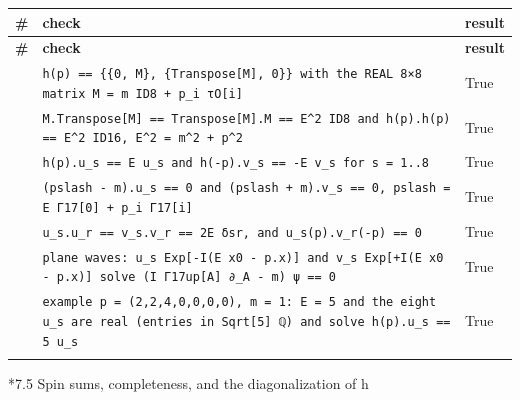 \documentclass[10pt,a4paper]{article}
\makeatletter
\renewcommand\subsubsection{\@startsection{subsubsection}{3}{\z@}{-3.25ex\@plus -1ex \@minus -.2ex}{1.5ex \@plus .2ex}{\normalfont\normalsize\bfseries\raggedright}}
\makeatother
\begin{document}
{\footnotesize
\begin{longtable}{>{\raggedright\arraybackslash}p{}>{\raggedright\arraybackslash}p{}>{\raggedright\arraybackslash}p{}}
\toprule
\textbf{\#} & \textbf{check} & \textbf{result} \\
\midrule\endfirsthead
\toprule
\textbf{\#} & \textbf{check} & \textbf{result} \\
\midrule\endhead
\endfoot
\bottomrule\endlastfoot
137 & \texttt{h(p) == \{\{0, M\}, \{Transpose[M], 0\}\} with the REAL 8×8 matrix M = m ID8 + p\_\allowbreak{}i τO[i]} & True \\
138 & \texttt{M.Transpose[M] == Transpose[M].M == E\textasciicircum{}2 ID8 and h(p).h(p) == E\textasciicircum{}2 ID16, E\textasciicircum{}2 = m\textasciicircum{}2 + p\textasciicircum{}2} & True \\
139 & \texttt{h(p).u\_\allowbreak{}s == E u\_\allowbreak{}s and h(-p).v\_\allowbreak{}s == -E v\_\allowbreak{}s for s = 1..8} & True \\
140 & \texttt{(pslash - m).u\_\allowbreak{}s == 0 and (pslash + m).v\_\allowbreak{}s == 0, pslash = E Γ17[0] + p\_\allowbreak{}i Γ17[i]} & True \\
141 & \texttt{u\_\allowbreak{}s.u\_\allowbreak{}r == v\_\allowbreak{}s.v\_\allowbreak{}r == 2E δsr, and u\_\allowbreak{}s(p).v\_\allowbreak{}r(-p) == 0} & True \\
142 & \texttt{plane waves: u\_\allowbreak{}s Exp[-I(E x0 - p.x)] and v\_\allowbreak{}s Exp[+I(E x0 - p.x)] solve (I Γ17up[A] ∂\_\allowbreak{}A - m) ψ == 0} & True \\
143 & \texttt{example p = (2,2,4,0,0,0,0), m = 1: E = 5 and the eight u\_\allowbreak{}s are real (entries in Sqrt[5] ℚ) and solve h(p).u\_\allowbreak{}s == 5 u\_\allowbreak{}s} & True \\*
\end{longtable}}
\subsubsection*{7.5 Spin sums, completeness, and the diagonalization of h}
\end{document}
